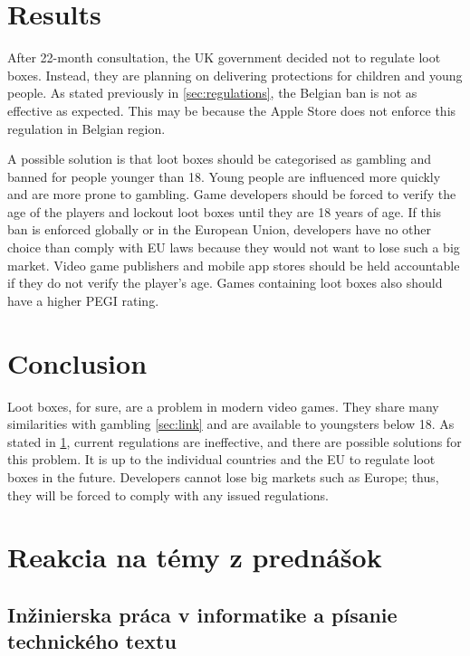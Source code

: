 \documentclass[10pt,oneside,english,a4paper]{article}
\begin{document}
\section{Results} \label{sec:results}

	After 22-month consultation, the UK government decided not to regulate loot boxes. Instead, they are planning on delivering protections for children and young people. As stated previously in \ref{sec:regulations}, the Belgian ban is not as effective as expected. This may be because the Apple Store does not enforce this regulation in Belgian region.\par
	A possible solution is that loot boxes should be categorised as gambling and banned for people younger than 18. Young people are influenced more quickly and are more prone to gambling. Game developers should be forced to verify the age of the players and lockout loot boxes until they are 18 years of age. If this ban is enforced globally or in the European Union, developers have no other choice than comply with EU laws because they would not want to lose such a big market. Video game publishers and mobile app stores should be held accountable if they do not verify the player's age. Games containing loot boxes also should have a higher PEGI rating\cite{pegi}.\par
	

\section{Conclusion} \label{sec:conclusion} %

	Loot boxes, for sure, are a problem in modern video games. They share many similarities with gambling \ref{sec:link} and are available to youngsters below 18. As stated in \ref{sec:results}, current regulations are ineffective, and there are possible solutions for this problem. It is up to the individual countries and the EU to regulate loot boxes in the future. Developers cannot lose big markets such as Europe; thus, they will be forced to comply with any issued regulations.

\section{Reakcia na témy z prednášok}

\subsection{Inžinierska práca v informatike a písanie technického textu}
\end{document}
